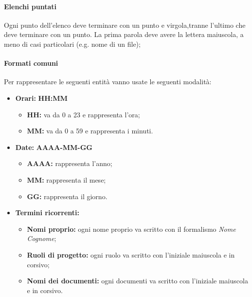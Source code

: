 \paragraph{Elenchi puntati} \Spazio
Ogni punto dell’elenco deve terminare con un punto e virgola,tranne l’ultimo che deve terminare con un punto. La prima parola deve avere la lettera maiuscola, a meno di casi particolari (e.g. nome di un file);

\paragraph{Formati comuni} \Spazio
\label{formati}
Per rappresentare le seguenti entità vanno usate le seguenti modalità:
\begin{itemize}

	\item \textbf{Orari:}
	      \textbf{HH:MM}
	      \begin{itemize}
		      \item \textbf{HH:} va da 0 a 23 e rappresenta l'ora;
		      \item \textbf{MM:} va da 0 a 59 e rappresenta i minuti.
	      \end{itemize}

	\item \textbf{Date:}
	      \textbf{AAAA-MM-GG}
	      \begin{itemize}
		      \item \textbf{AAAA:} rappresenta l'anno;
		      \item \textbf{MM:} rappresenta il mese;
		      \item \textbf{GG:} rappresenta il giorno.
	      \end{itemize}

	\item \textbf{Termini ricorrenti:}
	      \begin{itemize}
		      \item \textbf{Nomi proprio:} ogni nome proprio va scritto con il formalismo \textit{Nome Cognome};
		      \item \textbf{Ruoli di progetto:} ogni ruolo va scritto con l'iniziale maiuscola e in corsivo;
		      \item \textbf{Nomi dei documenti:} ogni documenti va scritto con l'iniziale maiuscola e in corsivo.
	      \end{itemize}

\end{itemize}

